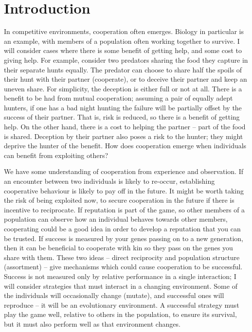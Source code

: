 \documentclass[a4paper,11pt,bcshonoursthesis,singlespace,oneside,thesisdraft,pdflatex]{cssethesis}
\begin{document}
\mainmatter						%

\chapter{Introduction}
\label{sec:intro}
In competitive environments, cooperation often emerges. 
Biology in particular is an example, with members of a population often working together to survive. 
I will consider cases where there is some benefit of getting help, and some cost to giving help. 
For example, consider two predators sharing the food they capture in their separate hunts equally. 
The predator can choose to share half the spoils of their hunt with their partner (cooperate), or to deceive their partner and keep an uneven share. 
For simplicity, the deception is either full or not at all. 
There is a benefit to be had from mutual cooperation; assuming a pair of equally adept hunters, if one has a bad night hunting the failure will be partially offset by the success of their partner. 
That is, risk is reduced, so there is a benefit of getting help. 
On the other hand, there is a cost to helping the partner -- part of the food is shared. 
Deception by their partner also poses a risk to the hunter; they might deprive the hunter of the benefit.  
How does cooperation emerge when individuals can benefit from exploiting others? 
 
We have some understanding of cooperation from experience and observation. 
If an encounter between two individuals is likely to re-occur, establishing cooperative behaviour is likely to pay off in the future. 
It might be worth taking the risk of being exploited now, to secure cooperation in the future if there is incentive to reciprocate. 
If reputation is part of the game, so other members of a population can observe how an individual behaves towards other members, cooperating could be a good idea in order to develop a reputation that you can be trusted. 
If success is measured by your genes passing on to a new generation, then it can be beneficial to cooperate with kin so they pass on the genes you share with them. 
These two ideas -- direct reciprocity and population structure (assortment) -- give mechanisms which could cause cooperation to be successful. 
Success is not measured only by relative performance in a single interaction; I will consider strategies that must interact in a changing environment. 
Some of the individuals will occasionally change (mutate), and successful ones will reproduce -- it will be an evolutionary environment. 
A successful strategy must play the game well, relative to others in the population, to ensure its survival, but it must also perform well as that environment changes.
\end{document}

